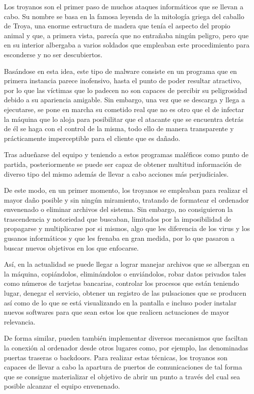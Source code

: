 Los troyanos son el primer paso de muchos ataques informáticos que se llevan a cabo. Su nombre se basa en la famosa leyenda de la mitología griega del caballo de Troya, una enorme estructura de madera que tenía el aspecto del propio animal y que, a primera vista, parecía que no entrañaba ningún peligro, pero que en su interior albergaba a varios soldados que empleaban este procedimiento para esconderse y no ser descubiertos.

Basándose en esta idea, este tipo de malware consiste en un programa que en primera instancia parece inofensivo, hasta el punto de poder resultar atractivo, por lo que las víctimas que lo padecen no son capaces de percibir su peligrosidad debido a su apariencia amigable. Sin embargo, una vez que se descarga y llega a ejecutarse, se pone en marcha su cometido real que no es otro que el de infectar la máquina que lo aloja para posibilitar que el atacante que se encuentra detrás de él se haga con el control de la misma, todo ello de manera transparente y prácticamente imperceptible para el cliente que es dañado.

Tras adueñarse del equipo y teniendo a estos programas maléficos como punto de partida, posteriormente se puede ser capaz de obtener multitud información de diverso tipo del mismo además de llevar a cabo acciones más perjudiciales.

De este modo, en un primer momento, los troyanos se empleaban para realizar el mayor daño posible y sin ningún miramiento, tratando de formatear el ordenador envenenado o eliminar archivos del sistema. Sin embargo, no consiguieron la trascendencia y notoriedad que buscaban, limitados por la imposibilidad de propagarse y multiplicarse por si mismos, algo que les diferencia de los virus y los gusanos informáticos y que les frenaba en gran medida, por lo que pasaron a buscar nuevos objetivos en los que enfocarse.

Así, en la actualidad se puede llegar a lograr manejar archivos que se albergan en la máquina, copiándolos, eliminándolos o enviándolos, robar datos privados tales como números de tarjetas bancarias, controlar los procesos que están teniendo lugar, denegar el servicio, obtener un registro de las pulsaciones que se producen así como de lo que se está visualizando en la pantalla e incluso poder instalar nuevos softwares para que sean estos los que realicen actuaciones de mayor relevancia.

De forma similar, pueden también implementar diversos mecanismos que faciltan la conexión al ordenador desde otros lugares como, por ejemplo, las denominadas puertas traseras o backdoors. Para realizar estas técnicas, los troyanos son capaces de llevar a cabo la apartura de puertos de comunicaciones de tal forma que se consigue materializar el objetivo de abrir un punto a través del cual sea posible alcanzar el equipo envenenado.

